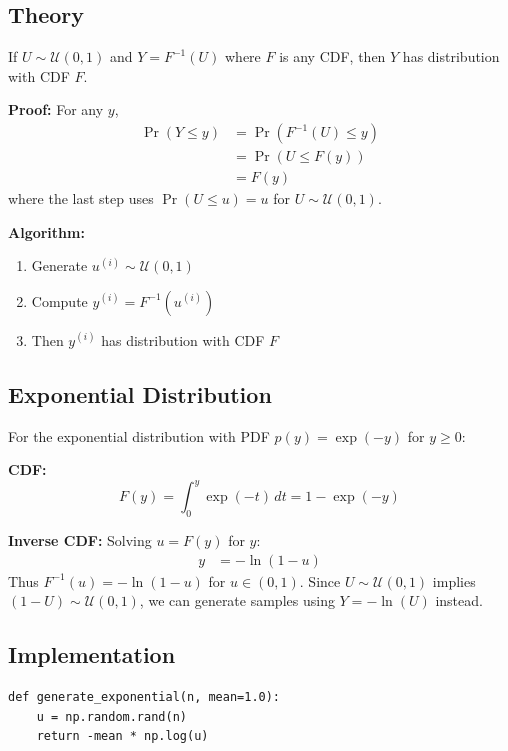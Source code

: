 \documentclass[
	a4paper, %
	10pt, %
	twoside, %
]{LTJournalArticle}
\begin{document}
\subsection{Theory}

If $U \sim \mathcal{U}(0,1)$ and $Y = F^{-1}(U)$ where $F$ is any CDF, then $Y$ has distribution with CDF $F$.

\textbf{Proof:} For any $y$,
\begin{align}
	\Pr(Y \leq y) & = \Pr(F^{-1}(U) \leq y) \nonumber \\
	              & = \Pr(U \leq F(y)) \nonumber      \\
	              & = F(y)
\end{align}
where the last step uses $\Pr(U \leq u) = u$ for $U \sim \mathcal{U}(0,1)$.

\textbf{Algorithm:}
\begin{enumerate}
	\item Generate $u^{(i)} \sim \mathcal{U}(0,1)$
	\item Compute $y^{(i)} = F^{-1}(u^{(i)})$
	\item Then $y^{(i)}$ has distribution with CDF $F$
\end{enumerate}

\subsection{Exponential Distribution}

For the exponential distribution with PDF $p(y) = \exp(-y)$ for $y \geq 0$:

\textbf{CDF:}
\begin{equation}
	F(y) = \int_{0}^{y} \exp(-t)\, dt = 1 - \exp(-y)
\end{equation}

\textbf{Inverse CDF:} Solving $u = F(y)$ for $y$:
\begin{align}
	y & = -\ln(1 - u)
\end{align}
Thus $F^{-1}(u) = -\ln(1 - u)$ for $u \in (0,1)$. Since $U \sim \mathcal{U}(0,1)$ implies $(1-U) \sim \mathcal{U}(0,1)$, we can generate samples using $Y = -\ln(U)$ instead.

\subsection{Implementation}

\begin{verbatim}
def generate_exponential(n, mean=1.0):
    u = np.random.rand(n)
    return -mean * np.log(u)
\end{verbatim}
\end{document}
